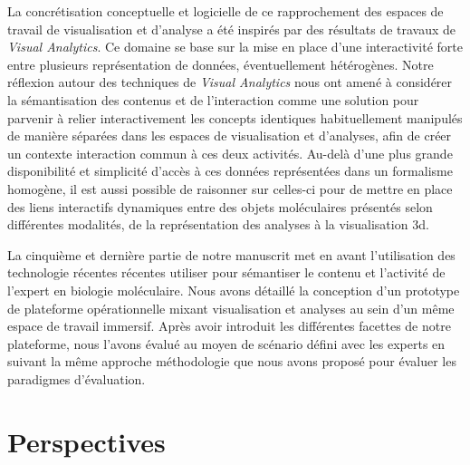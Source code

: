 La concrétisation conceptuelle et logicielle de ce rapprochement des espaces de travail de visualisation et d'analyse a été inspirés par des résultats de travaux de \textit{Visual Analytics}. Ce domaine se base sur la mise en place d'une interactivité forte entre plusieurs représentation de données, éventuellement hétérogènes. Notre réflexion autour des techniques de \textit{Visual Analytics} nous ont amené à considérer la sémantisation des contenus et de l'interaction comme une solution pour parvenir à relier interactivement les concepts identiques habituellement manipulés de manière séparées dans les espaces de visualisation et d'analyses, afin de créer un contexte interaction commun à ces deux activités. Au-delà d'une plus grande disponibilité et simplicité d'accès à ces données représentées dans un formalisme homogène, il est aussi possible de raisonner sur celles-ci pour de mettre en place des liens interactifs dynamiques entre des objets moléculaires présentés selon différentes modalités, de la représentation des analyses à la visualisation 3d. 

La cinquième et dernière partie de notre manuscrit met en avant l'utilisation des technologie récentes récentes utiliser pour sémantiser le contenu et l'activité de l'expert en biologie moléculaire. Nous avons détaillé la conception d'un prototype de plateforme opérationnelle  mixant visualisation et analyses au sein d'un même espace de travail immersif. Après avoir introduit les différentes facettes de notre plateforme, nous l'avons évalué au moyen de scénario défini avec les experts en suivant la même approche méthodologie que nous avons proposé pour évaluer les paradigmes d'évaluation. 


\section*{Perspectives}



